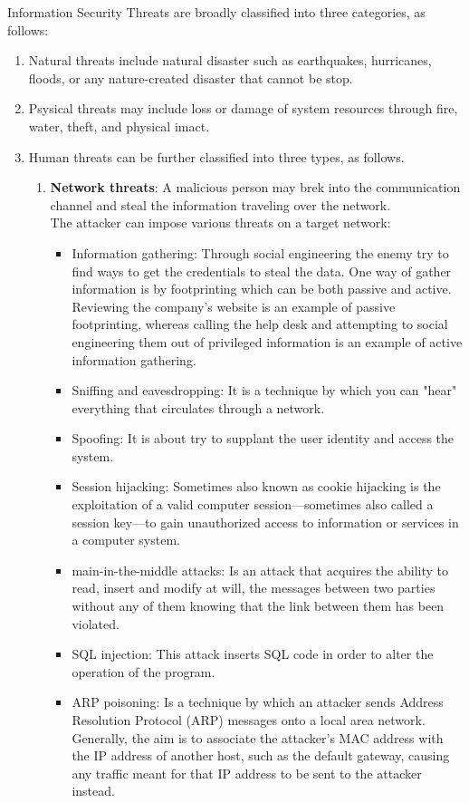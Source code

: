Information Security Threats are broadly classified into three categories, as follows:
\begin{enumerate}
	\item Natural threats include natural disaster such as earthquakes, hurricanes, floods, or any nature-created disaster that cannot be stop.
	\item Psysical threats may include loss or damage of system resources through fire, water, theft, and physical imact.
	\item Human threats can be further classified into three types, as follows.
	\begin{enumerate}
		\item \textbf{Network threats}: A malicious person may brek into the communication channel and steal the information traveling over the network.\\
		The attacker can impose various threats on a target network:
		\begin{itemize}
			\item Information gathering: Through social engineering the enemy try to find ways to get the credentials to steal the data. One way of gather information is by footprinting which can be both passive and active. Reviewing the company's website is an example of passive footprinting, whereas calling the help desk and attempting to social engineering them out of privileged information is an example of active information gathering.\cite{Hacking3}
			\item Sniffing and eavesdropping: It is a technique by which you can "hear" everything that circulates through a network.
			\item Spoofing: It is about try to supplant the user identity and access the system.
			\item Session hijacking: Sometimes also known as cookie hijacking is the exploitation of a valid computer session—sometimes also called a session key—to gain unauthorized access to information or services in a computer system.
			\item main-in-the-middle attacks: Is an attack that acquires the ability to read, insert and modify at will, the messages between two parties without any of them knowing that the link between them has been violated.
			\item SQL injection: This attack inserts SQL code in order to alter the operation of the program.
			\item ARP poisoning: Is a technique by which an attacker sends Address Resolution Protocol (ARP) messages onto a local area network. Generally, the aim is to associate the attacker's MAC address with the IP address of another host, such as the default gateway, causing any traffic meant for that IP address to be sent to the attacker instead.

\end{itemize}
\end{enumerate}
\end{enumerate}
